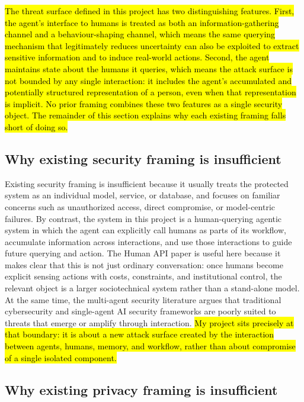 \documentclass[11pt]{article}
\begin{document}
\hl{The threat surface defined in this project has two distinguishing features. First, the agent's interface to humans is treated as both an information-gathering channel and a behaviour-shaping channel, which means the same querying mechanism that legitimately reduces uncertainty can also be exploited to extract sensitive information and to induce real-world actions. Second, the agent maintains state about the humans it queries, which means the attack surface is not bounded by any single interaction: it includes the agent's accumulated and potentially structured representation of a person, even when that representation is implicit. No prior framing combines these two features as a single security object. The remainder of this section explains why each existing framing falls short of doing so.}

\subsection{Why existing security framing is insufficient}

Existing security framing is insufficient because it usually treats the protected system as an individual model, service, or database, and focuses on familiar concerns such as unauthorized access, direct compromise, or model-centric failures. By contrast, the system in this project is a human-querying agentic system in which the agent can explicitly call humans as parts of its workflow, accumulate information across interactions, and use those interactions to guide future querying and action. The Human API paper is useful here because it makes clear that this is not just ordinary conversation: once humans become explicit sensing actions with costs, constraints, and institutional control, the relevant object is a larger sociotechnical system rather than a stand-alone model. At the same time, the multi-agent security literature argues that traditional cybersecurity and single-agent AI security frameworks are poorly suited to threats that emerge or amplify through interaction. \hl{My project sits precisely at that boundary: it is about a new attack surface created by the interaction between agents, humans, memory, and workflow, rather than about compromise of a single isolated component. }\citep{oliver2026humanapi,schroeder2025multiagentsecurity}

\subsection{Why existing privacy framing is insufficient}
\end{document}
